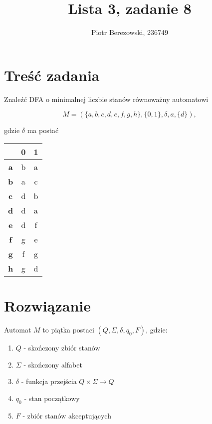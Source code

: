 \documentclass{article}
\title{Lista 3, zadanie 8}
\author{Piotr Berezowski, 236749}
\begin{document}
	\maketitle
	\newpage
	
	\section{Treść zadania}

    Znaleźć DFA o minimalnej liczbie stanów równoważny automatowi

    $$ M = (\{a, b, c, d, e, f, g, h\}, \{0, 1\}, \delta, a, \{d\}), $$

    gdzie $\delta$ ma postać 

    \begin{table}[h!]
		\begin{center}
			\begin{tabular}{c||c|c}
				& \textbf{0} & \textbf{1} \\
                \hline
                \hline
                \textbf{a} & b & a \\
                \hline
                \textbf{b} & a & c \\
                \hline
                \textbf{c} & d & b \\
                \hline
                \textbf{d} & d & a \\
                \hline
                \textbf{e} & d & f \\
                \hline
                \textbf{f} & g & e \\
                \hline
                \textbf{g} & f & g \\
                \hline
                \textbf{h} & g & d \\
			\end{tabular}
		\end{center}
	\end{table}

    \section{Rozwiązanie}

    Automat $M$ to piątka postaci $(Q, \Sigma, \delta, q_0, F)$, gdzie:
    
    \begin{enumerate}
        \item $Q$ - skończony zbiór stanów
        \item $\Sigma$ - skończony alfabet
        \item $\delta$ - funkcja przejścia $Q \times \Sigma \rightarrow Q$
        \item $q_0$ - stan początkowy
        \item $F$ - zbiór stanów akceptujących
    \end{enumerate}
\end{document}
